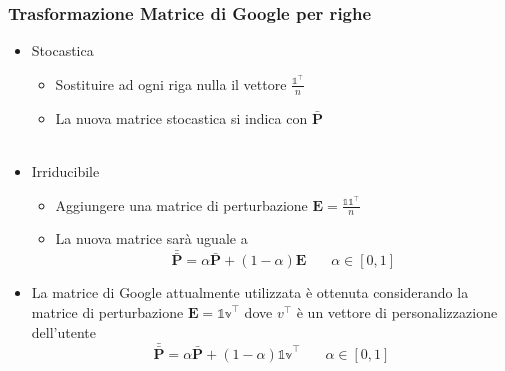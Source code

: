 \documentclass{beamer}
\begin{document}
\begin{frame}
	\frametitle{Trasformazione Matrice di Google per righe}
	\begin{itemize}
		\item Stocastica
		\begin{itemize}
			\item Sostituire ad ogni riga nulla il vettore $\frac{\mathbb{1}^\intercal}{n}$
			\item La nuova matrice stocastica si indica con $\bar{\textbf{P}}$\\~\\
		\end{itemize}
		
		\item Irriducibile
				\begin{itemize}
					\item Aggiungere una matrice di perturbazione $\textbf{E} = \frac{\mathbb{11}^\intercal}{n}$
					\item La nuova matrice sarà uguale a  $$\bar{\bar{\textbf{P}}} = \alpha\bar{\textbf{P}} + (1-\alpha)\textbf{E} ~~~~~~~~ \alpha \in [0,1]$$
				\end{itemize}
	\end{itemize}
\end{frame}

\begin{frame}
	\begin{itemize}
		\item La matrice di Google attualmente utilizzata è ottenuta
		considerando la matrice di perturbazione  $\textbf{E} = \mathbb{1v}^\intercal$ dove $v^\intercal$ è un vettore di personalizzazione dell'utente $$\bar{\bar{\textbf{P}}} = \alpha\bar{\textbf{P}} + (1-\alpha)\mathbb{1v}^\intercal ~~~~~~~~ \alpha \in [0,1]$$
	\end{itemize}
\end{frame}

\end{document}
